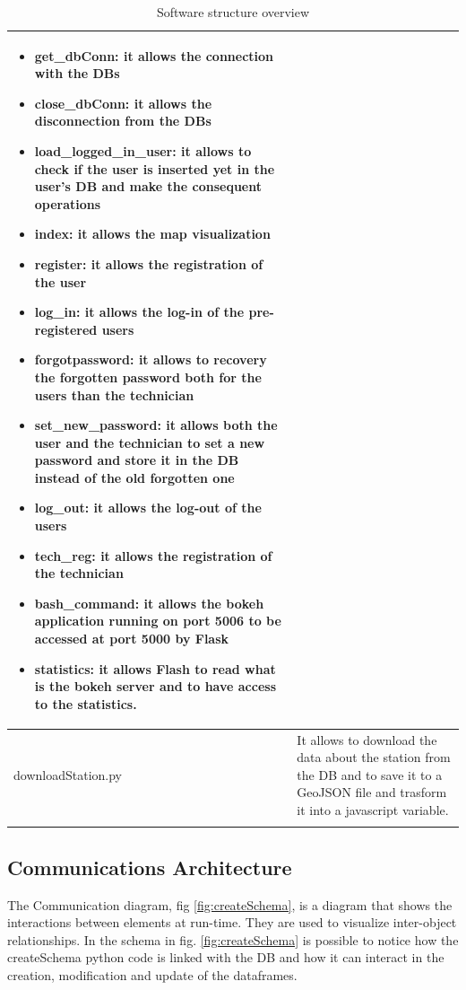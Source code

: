 \documentclass{article}
\begin{document}
\begin{longtable}[H]{|l|p{}|}
\begin{itemize}
         \item get\_dbConn: it allows the connection with the  DBs
         \item close\_dbConn: it allows the disconnection from the  DBs
         \item load\_logged\_in\_user: it allows to check if the user is inserted yet in the user’s DB and make the consequent operations
         \item index: it allows the map visualization
         \item register: it allows the registration of the user
         \item log\_in: it allows the log-in of the pre-registered users
         \item forgotpassword: it allows to recovery the forgotten password both for the users than the technician
         \item set\_new\_password: it allows both the user and the technician to set a new password and store it in the DB instead of the old forgotten one
         \item log\_out: it allows the log-out of the users 
         \item tech\_reg: it allows the registration of the technician
         \item bash\_command: it allows the bokeh application running on port 5006 to be accessed at port 5000 by Flask
         \item statistics: it allows Flash to read what is the bokeh server and to have access to the statistics.
     \end{itemize}
     \\
    \hline
    downloadStation.py & It allows to download the data about the station from the DB and to save it to a GeoJSON file and trasform it into a javascript variable. 
      \\
    \hline
\caption{Software structure overview } \\
\end{longtable}
      
\subsection{Communications Architecture}
The Communication diagram, fig \ref{fig:createSchema}, is a diagram that shows the interactions between elements at run-time. They  are used to visualize inter-object relationships.
In the schema in fig. \ref{fig:createSchema} is possible to notice how the createSchema python code is linked with the DB and how it can interact in the creation, modification and update of the dataframes.
\end{document}
